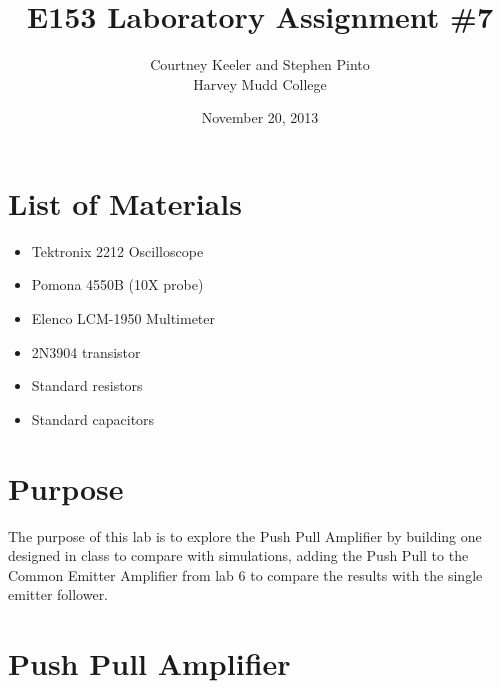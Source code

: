 \documentclass[12pt,letterpaper]{report}
\begin{document}
\title{E153 Laboratory Assignment \#7}
\author{Courtney Keeler and Stephen Pinto\\
Harvey Mudd College}
\date{November 20, 2013}
\maketitle

\section*{List of Materials}
\begin{itemize}
	\item Tektronix 2212 Oscilloscope
	\item Pomona 4550B (10X probe)
	\item Elenco LCM-1950 Multimeter
	\item 2N3904 transistor
	\item Standard resistors
	\item Standard capacitors
\end{itemize}

\section*{Purpose}
The purpose of this lab is to explore the Push Pull Amplifier by building one designed in class to compare with simulations, adding the Push Pull to the Common Emitter Amplifier from lab 6 to compare the results with the single emitter follower.

\section*{Push Pull Amplifier}
\end{document}
